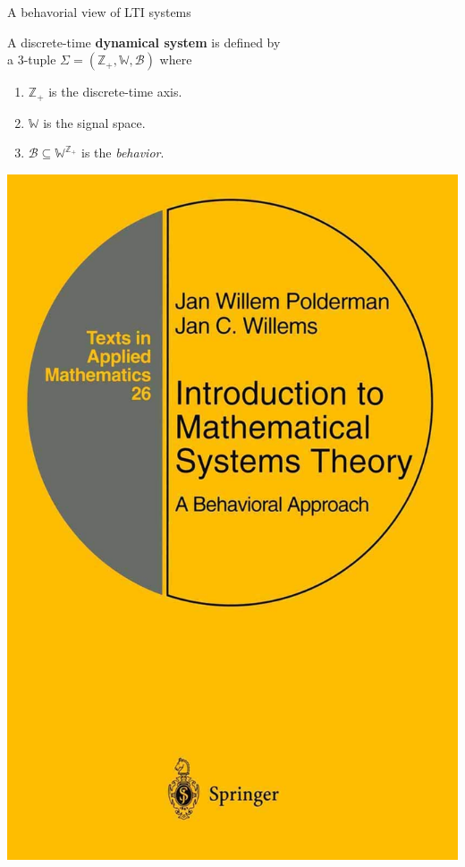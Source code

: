 \documentclass[aspectratio=169,compress,12pt,dvipsnames]{beamer}
\begin{document}
\begin{frame}[t, c]{A behavorial view of LTI systems}
    \vfill
    \begin{minipage}{.68\textwidth}
        \begin{definition}
            A discrete-time \textbf{dynamical system} is defined by\\ a 3-tuple $\Sigma = (\mathbb{Z}_+, \mathbb{W}, \mathcal{B})$ where
            \par\bigskip
            \begin{enumerate}
                \item   $\mathbb{Z}_+$ is the discrete-time axis.
                \item   $\mathbb{W}$ is the signal space.
                \item   $\mathcal{B} \subseteq \mathbb{W}^{\mathbb{Z}_+}$ is the \emph{behavior}.
            \end{enumerate}
        \end{definition}
    \end{minipage}%
    \hfill
    \begin{minipage}{.28\textwidth}
        \centering
        \includegraphics[width=\textwidth]{willems_book.jpg}
    \end{minipage}
    \vfill
\end{frame}
\end{document}
